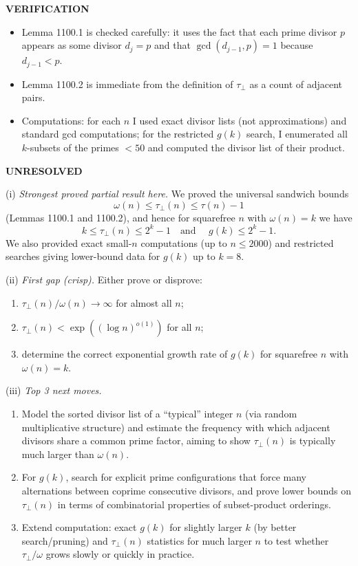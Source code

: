 \medskip
\noindent\textbf{VERIFICATION}

\smallskip
\noindent
\begin{itemize}
\item Lemma 1100.1 is checked carefully: it uses the fact that each prime divisor $p$ appears as some divisor $d_j=p$ and that $\gcd(d_{j-1},p)=1$ because $d_{j-1}<p$.
\item Lemma 1100.2 is immediate from the definition of $\tau_\perp$ as a count of adjacent pairs.
\item Computations: for each $n$ I used exact divisor lists (not approximations) and standard gcd computations; for the restricted $g(k)$ search, I enumerated all $k$-subsets of the primes $<50$ and computed the divisor list of their product.
\end{itemize}

\medskip
\noindent\textbf{UNRESOLVED}

\smallskip
\noindent
(i) \emph{Strongest proved partial result here.}
We proved the universal sandwich bounds
\[
\omega(n)\le \tau_\perp(n)\le \tau(n)-1
\]
(Lemmas 1100.1 and 1100.2), and hence for squarefree $n$ with $\omega(n)=k$ we have
\[
 k\le \tau_\perp(n)\le 2^k-1\quad\text{and }\quad g(k)\le 2^k-1.
\]
We also provided exact small-$n$ computations (up to $n\le 2000$) and restricted searches giving lower-bound data for $g(k)$ up to $k=8$.

\smallskip
\noindent
(ii) \emph{First gap (crisp).}
Either prove or disprove:
\begin{enumerate}
\item $\tau_\perp(n)/\omega(n)\to\infty$ for almost all $n$;
\item $\tau_\perp(n)<\exp((\log n)^{o(1)})$ for all $n$;
\item determine the correct exponential growth rate of $g(k)$ for squarefree $n$ with $\omega(n)=k$.
\end{enumerate}

\smallskip
\noindent
(iii) \emph{Top 3 next moves.}
\begin{enumerate}
\item Model the sorted divisor list of a ``typical'' integer $n$ (via random multiplicative structure) and estimate the frequency with which adjacent divisors share a common prime factor, aiming to show $\tau_\perp(n)$ is typically much larger than $\omega(n)$.
\item For $g(k)$, search for explicit prime configurations that force many alternations between coprime consecutive divisors, and prove lower bounds on $\tau_\perp(n)$ in terms of combinatorial properties of subset-product orderings.
\item Extend computation: exact $g(k)$ for slightly larger $k$ (by better search/pruning) and $\tau_\perp(n)$ statistics for much larger $n$ to test whether $\tau_\perp/\omega$ grows slowly or quickly in practice.
\end{enumerate}

